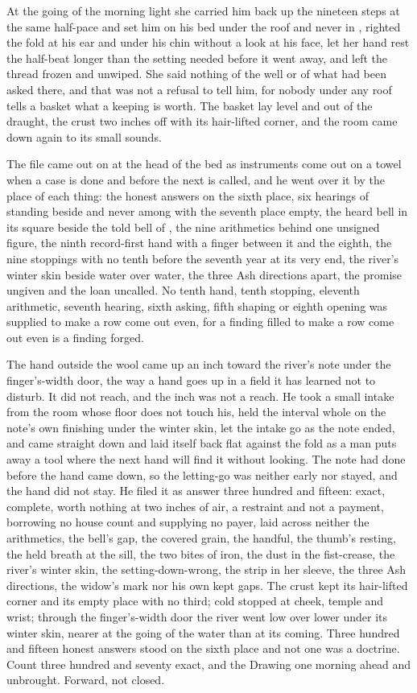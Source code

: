 At the going of the morning light she carried him back up the nineteen steps at the same half-pace and set him on his bed under the roof and never in , righted the fold at his ear and under his chin without a look at his face, let her hand rest the half-beat longer than the setting needed before it went away, and left the thread frozen and unwiped. She said nothing of the well or of what had been asked there, and that was not a refusal to tell him, for nobody under any roof tells a basket what a keeping is worth. The basket lay level and out of the draught, the crust two inches off with its hair-lifted corner, and the room came down again to its small sounds.

The file came out on  at the head of the bed as instruments come out on a towel when a case is done and before the next is called, and he went over it by the place of each thing: the honest answers on the sixth place, six hearings of  standing beside and never among with the seventh place empty, the heard bell in its square beside the told bell of , the nine arithmetics behind one unsigned figure, the ninth record-first hand with a finger between it and the eighth, the nine stoppings with no tenth before the seventh year at its very end, the river's winter skin beside water over water, the three Ash directions apart, the promise ungiven and the loan uncalled. No tenth hand, tenth stopping, eleventh arithmetic, seventh hearing, sixth asking, fifth shaping or eighth opening was supplied to make a row come out even, for a finding filled to make a row come out even is a finding forged.

The hand outside the wool came up an inch toward the river's note under the finger's-width door, the way a hand goes up in a field it has learned not to disturb. It did not reach, and the inch was not a reach. He took a small intake from the room whose floor does not touch his, held the interval whole on the note's own finishing under the winter skin, let the intake go as the note ended, and came straight down and laid itself back flat against the fold as a man puts away a tool where the next hand will find it without looking. The note had done before the hand came down, so the letting-go was neither early nor stayed, and the hand did not stay. He filed it as answer three hundred and fifteen: exact, complete, worth nothing at two inches of air, a restraint and not a payment, borrowing no house count and supplying no payer, laid across neither the arithmetics, the bell's gap, the covered grain, the handful, the thumb's resting, the held breath at the sill, the two bites of iron, the dust in the fist-crease, the river's winter skin, the setting-down-wrong, the strip in her sleeve, the three Ash directions, the widow's mark nor his own kept gaps. The crust kept its hair-lifted corner and its empty place with no third; cold stopped at cheek, temple and wrist; through the finger's-width door the river went low over lower under its winter skin, nearer at the going of the water than at its coming. Three hundred and fifteen honest answers stood on the sixth place and not one was a doctrine. Count three hundred and seventy exact, and the Drawing one morning ahead and unbrought. Forward, not closed.
